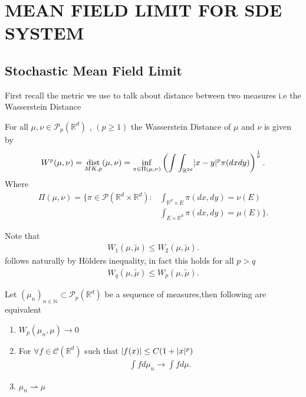 \chapter{MEAN FIELD LIMIT FOR SDE SYSTEM}



\section{Stochastic Mean Field Limit}
First recall the metric we use to talk about distance between two measures i.e the Wasserstein Distance
\begin{definition}
  For all $\mu , \nu  \in  \mathcal{P}_p(\mathbb{R}^{d} )$  , $(p\ge 1) $ the Wasserstein Distance of $\mu $ and $\nu $ is given by 
  \begin{align*}
    W^{p}(\mu ,\nu ) = \operatorname*{dist}_{MK,p}(\mu ,\nu ) = \inf_{\pi \in  \Pi(\mu ,\nu )} \left( \int \int_{\mathbb{R}^{2d} } \lvert x-y\rvert^{p} \pi(dxdy) \right)^{\frac{1}{p}}  
  .\end{align*}
  Where  
  \begin{align*}
    \Pi(\mu ,\nu ) = \Bigg\{\pi \in \mathcal{P}(\mathbb{R}^{d} \times  \mathbb{R}^{d}  ) : &\int_{\mathbb{R}^{d}\times E } \pi(dx,dy) = \nu(E) \\
                                                                                      &\int_{E \times  \mathbb{R}^{d} } \pi(dx,dy) = \mu(E)\Bigg\}  
  .\end{align*}
\end{definition}
\begin{remark}
 Note that 
 \begin{align*}
   W_1(\mu ,\tilde{\mu } ) \le  W_{2}(\mu ,\tilde{\mu } )
 .\end{align*}
 follows naturally by Hölders inequality, in fact this holds for all $p>q$
  \begin{align*}
   W_q(\mu ,\tilde{\mu } ) \le  W_{p}(\mu ,\tilde{\mu } )
 .\end{align*}
\end{remark}
\begin{remark}
  Let $(\mu_n)_{n \in  \mathbb{N}} \subset  \mathcal{P}_p(\mathbb{R}^{d} )$ be a sequence of measures,then following are equivalent
  \begin{enumerate}
   \item $W_p(\mu_n,\mu ) \to 0$
    \item  For $\forall f \in \mathcal{C}(\mathbb{R}^{d} )$ such that $\lvert f(x)\rvert \le  C(1+\lvert x\rvert^{p} )$
     \begin{align*}
      \int  f d\mu_n \to \int  f d\mu 
     .\end{align*} 
    \item $\mu_n \rightharpoonup \mu $
  \end{enumerate} 
\end{remark}
\newpage
